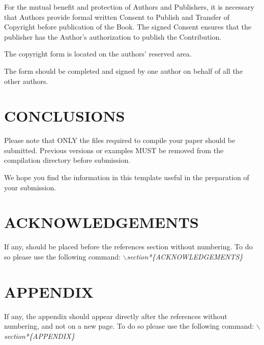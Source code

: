 \documentclass[a4paper,twoside]{article}
\begin{document}
\noindent For the mutual benefit and protection of Authors and
Publishers, it is necessary that Authors provide formal written
Consent to Publish and Transfer of Copyright before publication of
the Book. The signed Consent ensures that the publisher has the
Author's authorization to publish the Contribution.

The copyright form is located on the authors' reserved area.

The form should be completed and signed by one author on
behalf of all the other authors.

\section{\uppercase{Conclusions}}
\label{sec:conclusion}

\noindent Please note that ONLY the files required to compile your paper should be submitted. Previous versions or examples MUST be removed from the compilation directory before submission.

We hope you find the information in this template useful in the preparation of your submission.

\section*{\uppercase{Acknowledgements}}

\noindent If any, should be placed before the references section
without numbering. To do so please use the following command:
\textit{$\backslash$section*\{ACKNOWLEDGEMENTS\}}





{\small
}



\section*{\uppercase{Appendix}}

\noindent If any, the appendix should appear directly after the
references without numbering, and not on a new page. To do so please use the following command:
\textit{$\backslash$section*\{APPENDIX\}}

\vfill
\end{document}
